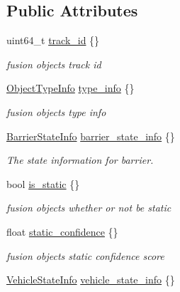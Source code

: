 \subsection*{Public Attributes}
\begin{DoxyCompactItemize}
\item 
uint64\+\_\+t \hyperlink{structmaf__perception__interface_1_1PerceptionFusionObjectData_a79c5c197d0e37d2472e3f08da6160ac0}{track\+\_\+id} \{\}
\begin{DoxyCompactList}\small\item\em fusion objects track id \end{DoxyCompactList}\item 
\hyperlink{structmaf__perception__interface_1_1ObjectTypeInfo}{Object\+Type\+Info} \hyperlink{structmaf__perception__interface_1_1PerceptionFusionObjectData_a3781c3926ef31b59787172183fd5f9d9}{type\+\_\+info} \{\}
\begin{DoxyCompactList}\small\item\em fusion objects type info \end{DoxyCompactList}\item 
\hyperlink{structmaf__perception__interface_1_1BarrierStateInfo}{Barrier\+State\+Info} \hyperlink{structmaf__perception__interface_1_1PerceptionFusionObjectData_a61332d846c19f9387fc712c2475ee065}{barrier\+\_\+state\+\_\+info} \{\}
\begin{DoxyCompactList}\small\item\em The state information for barrier. \end{DoxyCompactList}\item 
bool \hyperlink{structmaf__perception__interface_1_1PerceptionFusionObjectData_af802e7b68d24fa404c4824e338cc85e5}{is\+\_\+static} \{\}
\begin{DoxyCompactList}\small\item\em fusion objects whether or not be static \end{DoxyCompactList}\item 
float \hyperlink{structmaf__perception__interface_1_1PerceptionFusionObjectData_ae6415783ba35a3811bbac2b47ba1eab3}{static\+\_\+confidence} \{\}
\begin{DoxyCompactList}\small\item\em fusion objects static confidence score \end{DoxyCompactList}\item 
\hyperlink{structmaf__perception__interface_1_1VehicleStateInfo}{Vehicle\+State\+Info} \hyperlink{structmaf__perception__interface_1_1PerceptionFusionObjectData_a404e5584551dfe48164b0bd3ca88b5d5}{vehicle\+\_\+state\+\_\+info} \{\}

\end{DoxyCompactItemize}
